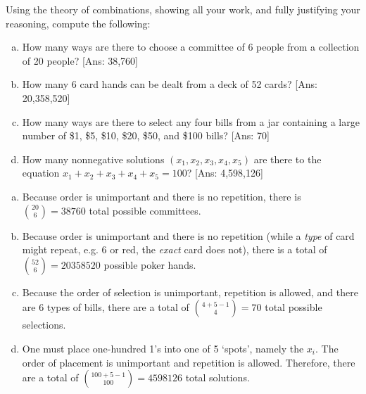 \documentclass[11pt,letterpaper]{article}
\begin{document}
\newpage



 Using the theory of combinations, showing all your work, and fully justifying your reasoning, compute the following:	
	\begin{enumerate}[(a)]
	\item How many ways are there to choose a committee of 6 people from a collection of 20 people? [Ans: 38,760]
	\item How many 6 card hands can be dealt from a deck of 52 cards? [Ans: 20,358,520]
	\item How many ways are there to select any four bills from a jar containing a large number of \$1, \$5, \$10, \$20, \$50, and \$100 bills? [Ans: 70]
	\item How many nonnegative solutions $(x_1, x_2, x_3, x_4, x_5)$ are there to the equation $x_1 + x_2 + x_3 + x_4 + x_5= 100$? [Ans: 4,598,126]
	\end{enumerate} \pspace

\sol 
\begin{enumerate}[(a)]
\item Because order is unimportant and there is no repetition, there is $\binom{20}{6}= 38760$ total possible committees. \pspace

\item Because order is unimportant and there is no repetition (while a \textit{type} of card might repeat, e.g. 6 or red, the \textit{exact} card does not), there is a total of $\binom{52}{6}= 20358520$ possible poker hands. \pspace

\item Because the order of selection is unimportant, repetition is allowed, and there are 6 types of bills, there are a total of $\binom{4 + 5 - 1}{4}= 70$ total possible selections. \pspace

\item One must place one-hundred 1's into one of 5 `spots', namely the $x_i$. The order of placement is unimportant and repetition is allowed. Therefore, there are a total of $\binom{100 + 5 - 1}{100}= 4598126$ total solutions. 
\end{enumerate}



\newpage
\end{document}
